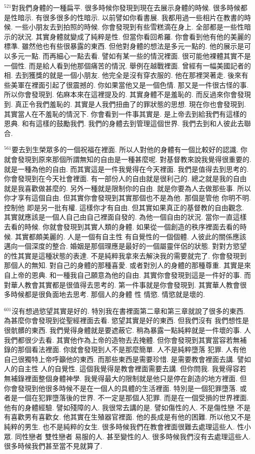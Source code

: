 \documentclass{book}
\begin{document}
$^{521}$對我們身體的一種扁平.
很多時候你發現到現在去展示身體的時候.
很多時候都是性暗示.
有很多很多的性暗示.
以前譬如你看書展.
我都用過一些相片在教書的時候.
一些小朋友去到拍照的時候.
你會發現到有些雪糕滴在身上.
全部都是一些性暗示的狀況.
其實身體就變成了純粹是性.
但當你看回希羅.
你會看到他有他的美麗的標準.
雖然他也有些很暴露的東西.
但他對身體的想法是多元一點的.
他的展示是可以多元一點.
而再細心一點去看.
譬如有某一些的情況裡面.
很可能他裸體其實不是一個性.
而是給人看到他那個痛苦的情況.
舉例在越戰裡面.
曾經有一幅美國記者的相.
去到獲獎的就是一個小朋友.
他完全是沒有穿衣服的.
他在那裡哭著走.
後來有些美軍在裡面引起了很震撼的.
你如果當他又是一個色情.
那又是一件很古怪的事.
所以你會發現到.
佑麻本來在這裡提及的.
其實身體不是羞恥的.
而反過來你會發現到.
真正令我們羞恥的.
其實是人我們扭曲了的罪狀態的思想.
現在你也會發現到.
其實當人在不羞恥的情況下.
你會看到一件事其實是.
是上帝去到給我們有這樣的恩典.
和有這樣的鼓勵我們.
我們的身體去到管理這個世界.
我們去到和人彼此去聯合.

$^{561}$要去到生榮眾多的一個祝福在裡面.
所以人對他的身體有一個比較好的認識.
你就會發現到原來那個所謂無知的自由是一種甚麼呢.
對基督教來說我覺得很重要的.
就是一種為他的自由.
而其實這是一件我覺得在今天裡面.
我們是值得去到思考的.
你會發現到在今天社會裡面.
有一部份人的自由就是很利己的.
總之就是我的自由就是我喜歡做甚麼的.
另外一種就是限制你的自由.
就是你要為人去做那些事.
所以你才享有這個自由.
但其實你會發現到其實那個也不是為他.
那個是管他 你明不明.
控制他 即是另一批有權.
這樣你才有自由.
但其實如果真正的基督教的自由觀念.
其實就應該是一個人自己由自己裡面自發的.
為他一個自由的狀況.
當你一直這樣去看的時候.
你就會發現到其實人類的身體.
如果從一個創造的秩序裡面去看的時候.
其實都頗美麗的.
人是一個有自主性 有自覺性的一個個體.
人彼此的關係應該邁向一個深度的整合.
婚姻是那個理應是最好的一個屬靈伴侶的狀態.
對對方慾望的性其實是這種狀態的表達.
不是純粹我拿來去解決我的需要就完了.
你會發現到那個人的無知.
對自己的身體的那種喜愛.
或者對別人的身體的那種尊重.
其實是來自上帝的恩典.
和一種我自己願意為他的自由.
其實你會發現到這是一件好的事.
而對華人教會其實都是很值得去思考的.
第一件事就是你會發現到.
其實華人教會很多時候都是很負面地去思考.
那個人的身體 性 情慾.
情慾就是壞的.

$^{601}$沒有想過慾望其實是好的.
特別我在書裡面第二章和第三章就說了很多的東西.
為甚麼你會發現到從聖經裡面去看.
慾望其實是好的東西.
但我們沒有 我們想性是很骯髒的東西.
我們覺得身體就是要遮蔽它.
稍為暴露一點純粹就是一件壞的事.
人我們都很少去看.
其實他作為上帝的造物去去掩體.
但你會發現到其實當容若無補錄的那個看法裡面.
你就會發現到人不是那麼簡單.
人不是純粹墮落 犯罪.
人有他自己很獨特上帝呼籲他的東西.
而那些東西是需要珍惜.
是需要教會裡面去講.
譬如人的自主性 人的自覺性.
這個我覺得是教會裡面需要去講.
但你問我.
我覺得容若無補錄裡面整個身體神學.
我覺得最大的限制就是他只是停在創造的地方裡面.
但你會發現到他很多時候不是在一個人的具體的生活裡面.
特別是一個犯罪墮落.
或者是一個在犯罪墮落後的世界.
不一定是那個人犯罪.
而是在一個受損的世界裡面.
他有的身體經驗.
譬如殘障的人.
我很常去講的是.
譬如傷性的人.
不是傷性戀 不是有喜歡男有喜歡女.
他其實在生殖器官裡面.
他的長成是有他的困難.
所以他又不是純粹的男生.
也不是純粹的女生.
很多時候我們在教會裡面很難去處理這些人.
性小眾.
同性戀者 雙性戀者 易服的人.
甚至變性的人.
很多時候我們沒有去處理這些人.
很多時候我們甚至當不見就算了.
\end{document}
